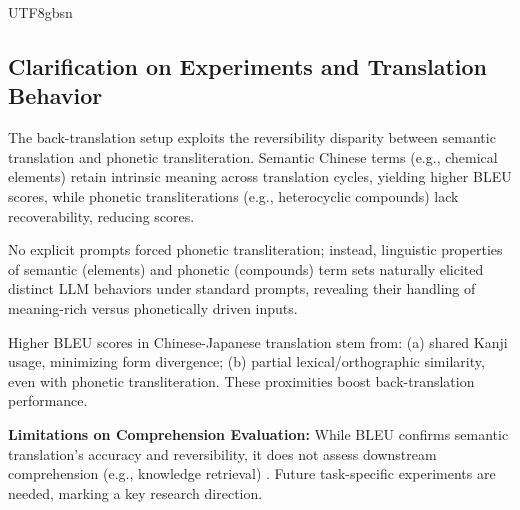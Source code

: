 \documentclass[conference]{IEEEtran}
\begin{document}
\begin{CJK*}{UTF8}{gbsn}


\subsection{Clarification on Experiments and Translation Behavior}

The back-translation setup exploits the reversibility disparity between semantic translation and phonetic transliteration. Semantic Chinese terms (e.g., chemical elements) retain intrinsic meaning across translation cycles, yielding higher BLEU scores, while phonetic transliterations (e.g., heterocyclic compounds) lack recoverability, reducing scores.

No explicit prompts forced phonetic transliteration; instead, linguistic properties of semantic (elements) and phonetic (compounds) term sets naturally elicited distinct LLM behaviors under standard prompts, revealing their handling of meaning-rich versus phonetically driven inputs.

Higher BLEU scores in Chinese-Japanese translation stem from: (a) shared Kanji usage, minimizing form divergence; (b) partial lexical/orthographic similarity, even with phonetic transliteration. These proximities boost back-translation performance.

\textbf{Limitations on Comprehension Evaluation:}
While BLEU confirms semantic translation’s accuracy and reversibility, it does not assess downstream comprehension (e.g., knowledge retrieval) \cite{chauhan2023comprehensive}. Future task-specific experiments are needed, marking a key research direction.


\end{CJK*}
\end{document}
